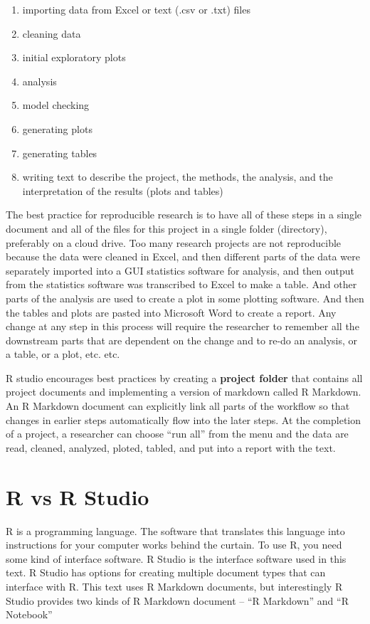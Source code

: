 \documentclass[]{book}
\providecommand{\tightlist}{%
  \setlength{\itemsep}{0pt}\setlength{\parskip}{0pt}}
\begin{document}
\begin{enumerate}
\def\labelenumi{\arabic{enumi}.}
\tightlist
\item
  importing data from Excel or text (.csv or .txt) files
\item
  cleaning data
\item
  initial exploratory plots
\item
  analysis
\item
  model checking
\item
  generating plots
\item
  generating tables
\item
  writing text to describe the project, the methods, the analysis, and the interpretation of the results (plots and tables)
\end{enumerate}

The best practice for reproducible research is to have all of these steps in a single document and all of the files for this project in a single folder (directory), preferably on a cloud drive. Too many research projects are not reproducible because the data were cleaned in Excel, and then different parts of the data were separately imported into a GUI statistics software for analysis, and then output from the statistics software was transcribed to Excel to make a table. And other parts of the analysis are used to create a plot in some plotting software. And then the tables and plots are pasted into Microsoft Word to create a report. Any change at any step in this process will require the researcher to remember all the downstream parts that are dependent on the change and to re-do an analysis, or a table, or a plot, etc. etc.

R studio encourages best practices by creating a \textbf{project folder} that contains all project documents and implementing a version of markdown called R Markdown. An R Markdown document can explicitly link all parts of the workflow so that changes in earlier steps automatically flow into the later steps. At the completion of a project, a researcher can choose ``run all'' from the menu and the data are read, cleaned, analyzed, ploted, tabled, and put into a report with the text.

\hypertarget{r-vs-r-studio}{%
\section{R vs R Studio}\label{r-vs-r-studio}}

R is a programming language. The software that translates this language into instructions for your computer works behind the curtain. To use R, you need some kind of interface software. R Studio is the interface software used in this text. R Studio has options for creating multiple document types that can interface with R. This text uses R Markdown documents, but interestingly R Studio provides two kinds of R Markdown document -- ``R Markdown'' and ``R Notebook''
\end{document}
